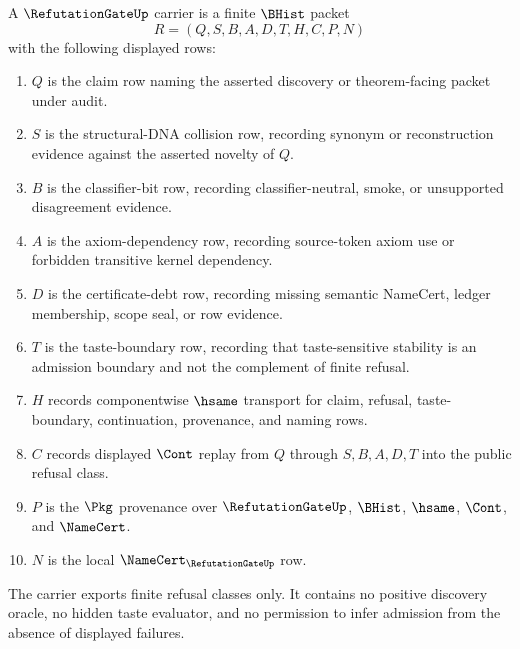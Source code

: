 \begin{definition}
\label{def:refutation-gate-carrier}
A $\RefutationGateUp$ carrier is a finite $\BHist$ packet
$$
R=(Q,S,B,A,D,T,H,C,P,N)
$$
with the following displayed rows:
\begin{enumerate}
\item $Q$ is the claim row naming the asserted discovery or theorem-facing packet under audit.
\item $S$ is the structural-DNA collision row, recording synonym or reconstruction evidence against the asserted novelty of $Q$.
\item $B$ is the classifier-bit row, recording classifier-neutral, smoke, or unsupported disagreement evidence.
\item $A$ is the axiom-dependency row, recording source-token axiom use or forbidden transitive kernel dependency.
\item $D$ is the certificate-debt row, recording missing semantic NameCert, ledger membership, scope seal, or row evidence.
\item $T$ is the taste-boundary row, recording that taste-sensitive stability is an admission boundary and not the complement of finite refusal.
\item $H$ records componentwise $\hsame$ transport for claim, refusal, taste-boundary, continuation, provenance, and naming rows.
\item $C$ records displayed $\Cont$ replay from $Q$ through $S,B,A,D,T$ into the public refusal class.
\item $P$ is the $\Pkg$ provenance over $\RefutationGateUp$, $\BHist$, $\hsame$, $\Cont$, and $\NameCert$.
\item $N$ is the local $\NameCert_{\RefutationGateUp}$ row.
\end{enumerate}
The carrier exports finite refusal classes only. It contains no positive discovery oracle, no hidden taste evaluator, and no permission to infer admission from the absence of displayed failures.
\end{definition}

